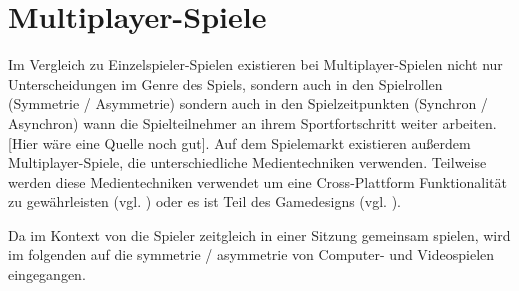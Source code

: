 

\section{Multiplayer-Spiele}
Im Vergleich zu Einzelspieler-Spielen existieren bei Multiplayer-Spielen nicht nur Unterscheidungen im Genre des Spiels, sondern auch in den Spielrollen (Symmetrie / Asymmetrie) sondern auch in den Spielzeitpunkten (Synchron / Asynchron) wann die Spielteilnehmer an ihrem Sportfortschritt weiter arbeiten. [Hier wäre eine Quelle noch gut]. Auf dem Spielemarkt existieren außerdem Multiplayer-Spiele, die unterschiedliche Medientechniken verwenden. Teilweise werden diese Medientechniken verwendet um eine Cross-Plattform Funktionalität zu gewährleisten (vgl. \cite{noauthor_baldurs_nodate}) oder es ist Teil des Gamedesigns (vgl. \cite{noauthor_keep_nodate}).

Da im Kontext von  die Spieler zeitgleich in einer Sitzung gemeinsam spielen, wird im folgenden auf die symmetrie / asymmetrie von Computer- und Videospielen eingegangen.




